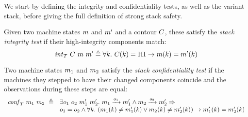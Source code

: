 \documentclass[acmsmall,review,anonymous]{acmart}\settopmatter{printfolios=true,printccs=false,printacmref=false}
\begin{document}
We start by defining the integrity and confidentiality tests, as well
as the variant stack, before giving the full definition of strong
stack safety.

\newcommand{\vse}{\mathit{vse}}
\newcommand{\VSES}{\mathit{VSE}}
\newcommand{\vs}{\mathit{vs}}
\newcommand{\VSS}{\mathit{VS}}

\newcommand*{\vm}[1]{\ensuremath{\mathit{vm}_{#1}}}
\newcommand*{\testInt}[3]{\ensuremath{\mathit{int}_T ~ #1 ~ #2 ~ #3}}
\newcommand*{\testConf}[2]{\ensuremath{\mathit{conf}_T ~ #1 ~ #2}}
\newcommand*{\testVS}[2]{\ensuremath{\mathit{\vs}_T ~ #1 ~ #2}}
\newcommand*{\testProp}[3]{\ensuremath{\mathit{stack}_T ~ #1 ~ #2 ~ #3}}

  Given two machine states $m$ and $m'$ and a contour $C$, these
  satisfy the \emph{stack integrity test} if their high-integrity components
  match:
  \[
    \testInt{\contour}{\mach}{\mach'} \triangleq
    \forall \component . ~
    \contour(\component) = \HIGHINT \rightarrow
    \mach(\component) = \mach'(\component)
  \]

 Two machine states $m_1$ and $m_2$ satisfy the
\emph{stack confidentiality test} if the machines they stepped to
have their changed components coincide and the observations during
these steps are equal:
\[
\begin{array}{rl}
  \mathit{conf}_T ~ m_1 ~ m_2 ~ \triangleq &
  \exists o_1 ~ o_2 ~ m_1' ~ m_2'. ~
  m_1 \xrightarrow{o_1} m_1' \wedge m_2 \xrightarrow{o_2} m_2' \Rightarrow \\
&    o_1 = o_2 \wedge \forall k . ~
   (     m_1(k) \neq m_1'(k)
    \vee m_2(k) \neq m_2'(k))
    \rightarrow m_1'(k) = m_2'(k)
\end{array}
  \]
\end{document}
